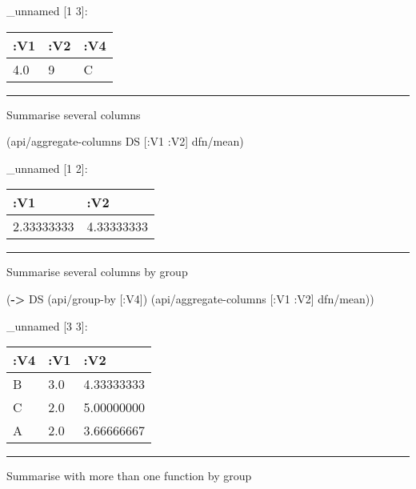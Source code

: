\documentclass[]{article}
\newenvironment{Shaded}{\begin{snugshade}}{\end{snugshade}}
\newcommand{\AttributeTok}[1]{\textcolor[rgb]{0.77,0.63,0.00}{#1}}
\newcommand{\KeywordTok}[1]{\textcolor[rgb]{0.13,0.29,0.53}{\textbf{#1}}}
\newcommand{\NormalTok}[1]{#1}
\begin{document}
\_unnamed {[}1 3{]}:

\begin{longtable}[]{@{}lll@{}}
\toprule
:V1 & :V2 & :V4\tabularnewline
\midrule
\endhead
4.0 & 9 & C\tabularnewline
\bottomrule
\end{longtable}

\begin{center}\rule{0.5\linewidth}{0.5pt}\end{center}

Summarise several columns

\begin{Shaded}
\begin{Highlighting}[]
\NormalTok{(api/aggregate-columns DS [}\AttributeTok{:V1} \AttributeTok{:V2}\NormalTok{] dfn/mean)}
\end{Highlighting}
\end{Shaded}

\_unnamed {[}1 2{]}:

\begin{longtable}[]{@{}ll@{}}
\toprule
:V1 & :V2\tabularnewline
\midrule
\endhead
2.33333333 & 4.33333333\tabularnewline
\bottomrule
\end{longtable}

\begin{center}\rule{0.5\linewidth}{0.5pt}\end{center}

Summarise several columns by group

\begin{Shaded}
\begin{Highlighting}[]
\NormalTok{(}\KeywordTok{->}\NormalTok{ DS}
\NormalTok{    (api/group-by [}\AttributeTok{:V4}\NormalTok{])}
\NormalTok{    (api/aggregate-columns [}\AttributeTok{:V1} \AttributeTok{:V2}\NormalTok{] dfn/mean))}
\end{Highlighting}
\end{Shaded}

\_unnamed {[}3 3{]}:

\begin{longtable}[]{@{}lll@{}}
\toprule
:V4 & :V1 & :V2\tabularnewline
\midrule
\endhead
B & 3.0 & 4.33333333\tabularnewline
C & 2.0 & 5.00000000\tabularnewline
A & 2.0 & 3.66666667\tabularnewline
\bottomrule
\end{longtable}

\begin{center}\rule{0.5\linewidth}{0.5pt}\end{center}

Summarise with more than one function by group
\end{document}

